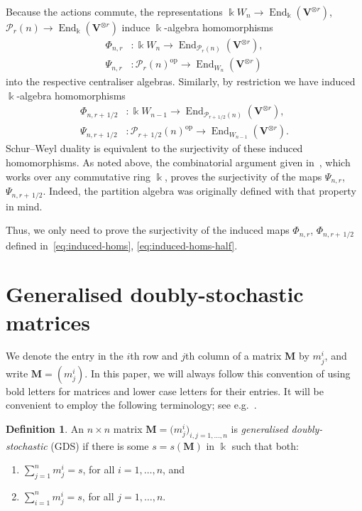 \documentclass[10pt]{article}
\theoremstyle{definition}
\newtheorem{defi}[theorem]{Definition}
\providecommand{\eg}{e.g.\ }
\DeclareMathOperator{\End}{End}
\DeclareMathOperator{\op}{op}
\newcommand{\Ptn}{\mathcal{P}}
\newcommand{\bM}{\mathbf{M}}
\newcommand{\V}{\mathbf{V}} %
\newcommand{\half}{\, 1/2} %
\begin{document}
Because the actions commute, the representations $\Bbbk W_n
\to \End_\Bbbk(\V^{\otimes r})$, $\Ptn_r(n) \to \End_\Bbbk(\V^{\otimes
 r})$ induce $\Bbbk$-algebra homomorphisms
\begin{equation}\label{eq:induced-homs}
\begin{aligned}
 \Phi_{n,r}&: \Bbbk W_n \to \End_{\Ptn_r(n)}( \V^{\otimes r} ),\\
 \Psi_{n,r}&: \Ptn_r(n)^{\op} \to \End_{W_n}( \V^{\otimes r} )
\end{aligned}
\end{equation}
into the respective centraliser algebras. Similarly, by restriction we
have induced $\Bbbk$-algebra homomorphisms
\begin{equation}\label{eq:induced-homs-half}
\begin{aligned}
 \Phi_{n,r+\half}&: \Bbbk W_{n-1}
 \to \End_{\Ptn_{r+\half}(n)}(\V^{\otimes r} ), \\ \Psi_{n,r+\half}&:
 \Ptn_{r+\half}(n)^{\op} \to \End_{W_{n-1}}( \V^{\otimes r} ).
\end{aligned}
\end{equation}
Schur--Weyl duality is equivalent to the surjectivity of these induced
homomorphisms. As noted above, the combinatorial argument given in~\cite[Thm.~3.6]{HR-2005}, which works over any commutative ring
$\Bbbk$, proves the surjectivity of the maps $\Psi_{n,r}$,
$\Psi_{n,r+\half}$. Indeed, the partition algebra was originally
defined with that property in mind.

Thus, we only need to prove the surjectivity of the induced maps
$\Phi_{n,r}$, $\Phi_{n,r+\half}$ defined in~\eqref{eq:induced-homs}, \eqref{eq:induced-homs-half}.



\section{Generalised doubly-stochastic matrices}%
\label{sec:GDS}%
We denote the entry in the $i$th row and $j$th column of a matrix
$\bM$ by $m^i_j$, and write $\bM=(m^i_j)$. In this paper, we will
always follow this convention of using bold letters for matrices and
lower case letters for their entries. 
It will be convenient to employ the following terminology; see \eg \cite{Brualdi, Johnsen, Gibson, Lai}.

\begin{defi}\label{def:GDS}
 An $n \times n$ matrix $\bM = \big( m^i_j \big)_{i,j = 1, \dots, n}$
 is \emph{generalised doubly-stochastic} (GDS) if there is some $s =
 s(\bM)$ in $\Bbbk$ such that both:
 \begin{enumerate}[label=(\alph*)]
 \item $\sum_{j=1}^n m^i_j = s$, for all $i=1, \dots, n$, and
 \item $\sum_{i=1}^n m^i_j = s$, for all $j = 1, \dots, n$. 
 \end{enumerate}
\end{defi}
\end{document}
